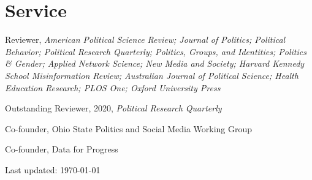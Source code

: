 \documentclass[letterpaper]{article}
\renewenvironment{itemize}{
  \begin{list}{}{
    \setlength{\leftmargin}{1.5em}
  }
}{
  \end{list}
}
\begin{document}
\section*{Service}

\begin{itemize}
\item Reviewer, \textit{American Political Science Review; Journal of Politics; Political Behavior; Political Research Quarterly; Politics, Groups, and Identities; Politics \& Gender; Applied Network Science; New Media and Society; Harvard Kennedy School Misinformation Review; Australian Journal of Political Science; Health Education Research; PLOS One; Oxford University Press}
\begin{itemize}
Outstanding Reviewer, 2020, \textit{Political Research Quarterly}
\end{itemize}
\item Co-founder, Ohio State Politics and Social Media Working Group
\item Co-founder, Data for Progress
\end{itemize}

\begin{center}
  \begin{footnotesize}
    Last updated: \today
      \end{footnotesize}
\end{center}
\end{document}

